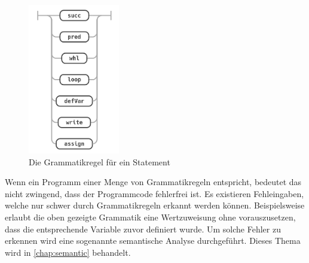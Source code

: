 \begin{figure}[h!]
	\centering
	\includegraphics[width=4cm]{content/pictures/statement.png}
	\caption{Die Grammatikregel für ein Statement}
	\label{pic:WhileRegelStatement}
\end{figure}

Wenn ein Programm einer Menge von Grammatikregeln entspricht, bedeutet das nicht zwingend, dass der Programmcode fehlerfrei ist. Es existieren Fehleingaben, welche nur schwer durch Grammatikregeln erkannt werden können. Beispielsweise erlaubt die oben gezeigte Grammatik eine Wertzuweisung ohne vorauszusetzen, dass die entsprechende Variable zuvor definiert wurde. Um solche Fehler zu erkennen wird eine sogenannte semantische Analyse durchgeführt. Dieses Thema wird in \cref{chap:semantic} behandelt.


